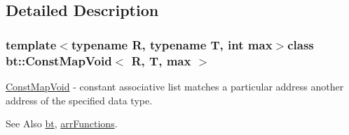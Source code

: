 \subsection{Detailed Description}
\subsubsection*{template$<$typename R, typename T, int max$>$class bt\-::\-Const\-Map\-Void$<$ R, T, max $>$}

\hyperlink{classbt_1_1_const_map_void}{Const\-Map\-Void} -\/ constant associative list matches a particular address another address of the specified data type. 

\begin{DoxySeeAlso}{See Also}
\hyperlink{namespacebt}{bt}, \hyperlink{group__apiinterface_gaba932fc93cbfe8bff149e2a49efcba24}{arr\-Functions}. 
\end{DoxySeeAlso}
